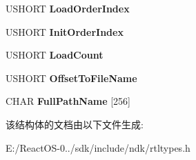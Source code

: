 \begin{DoxyCompactItemize}
\mbox{\label{struct___r_t_l___p_r_o_c_e_s_s___m_o_d_u_l_e___i_n_f_o_r_m_a_t_i_o_n_adc89b2375dc54f48fa5725388f27b959}} 
U\+S\+H\+O\+RT {\bfseries Load\+Order\+Index}
\item 
\mbox{\label{struct___r_t_l___p_r_o_c_e_s_s___m_o_d_u_l_e___i_n_f_o_r_m_a_t_i_o_n_a5e752f90f2175a9527057023ef06f13b}} 
U\+S\+H\+O\+RT {\bfseries Init\+Order\+Index}
\item 
\mbox{\label{struct___r_t_l___p_r_o_c_e_s_s___m_o_d_u_l_e___i_n_f_o_r_m_a_t_i_o_n_a48f77036cdd23acb040a735350220d97}} 
U\+S\+H\+O\+RT {\bfseries Load\+Count}
\item 
\mbox{\label{struct___r_t_l___p_r_o_c_e_s_s___m_o_d_u_l_e___i_n_f_o_r_m_a_t_i_o_n_a92b9b526c495895a8a5c1034d5107164}} 
U\+S\+H\+O\+RT {\bfseries Offset\+To\+File\+Name}
\item 
\mbox{\label{struct___r_t_l___p_r_o_c_e_s_s___m_o_d_u_l_e___i_n_f_o_r_m_a_t_i_o_n_a9493d4e8d4dce51de6e93facfa410ac2}} 
C\+H\+AR {\bfseries Full\+Path\+Name} \mbox{[}256\mbox{]}
\end{DoxyCompactItemize}


该结构体的文档由以下文件生成\+:\begin{DoxyCompactItemize}
\item 
E\+:/\+React\+O\+S-\/0../sdk/include/ndk/rtltypes.\+h\end{DoxyCompactItemize}
